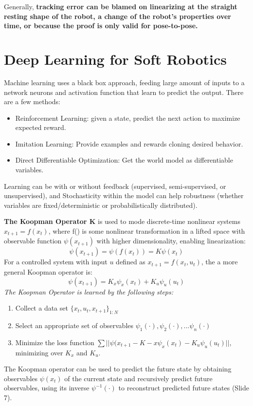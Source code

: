 \documentclass[onecolumn,a4paper]{article}
\begin{document}
Generally, \textbf{tracking error can be blamed on linearizing at the straight resting shape of the robot, a change of the robot's properties over time, or because the proof is only valid for pose-to-pose.}

\section{Deep Learning for Soft Robotics}

Machine learning uses a black box approach, feeding large amount of inputs to a network neurons and activation function that learn to predict the output. There are a few methods:
\begin{itemize}
    \item Reinforcement Learning: given a state, predict the next action to maximize expected reward.
    \item Imitation Learning: Provide examples and rewards cloning desired behavior.
    \item Direct Differentiable Optimization: Get the world model as differentiable variables.
\end{itemize}
Learning can be with or without feedback (supervised, semi-supervised, or unsupervised), and Stochasticity within the model can help robustness (whether variables are fixed/deterministic or probabilistically distributed).

\textbf{The Koopman Operator K} is used to mode discrete-time nonlinear systems $x_{t+1}=f(x_t)$, where f() is some nonlinear transformation in a lifted space with observable function $\psi(x_{t+1})$ with higher dimensionality, enabling linearization:
\begin{equation}
    \psi(x_{t+1})=\psi(f(x_t))=K\psi(x_t)
\end{equation}
For a controlled system with input $u$ defined as $x_{t+1} = f(x_t,u_t)$, the a more general Koopman operator is:
\begin{equation}
    \psi(x_{t+1})=K_x\psi_x(x_t)+K_u\psi_u(u_t)
\end{equation}
\emph{The Koopman Operator is learned by the following steps:}
\begin{enumerate}
    \item Collect a data set $\{x_t, u_t, x_{t+1}\}_{1:N}$
    \item Select an appropriate set of observables $\psi_1(\cdot), \psi_2(\cdot),...\psi_n(\cdot)$
    \item Minimize the loss function $\sum||\psi(x_{t+1}-K-x\psi_x(x_t)-K_u\psi_u(u_t)||$, minimizing over $K_x$ and $K_u$.
\end{enumerate}
The Koopman operator can be used to predict the future state by obtaining observables $\psi(x_t)$ of the current state and recursively predict future observables, using its inverse $\psi^{-1}(\cdot)$ to reconstruct predicted future states (Slide 7).
\end{document}

